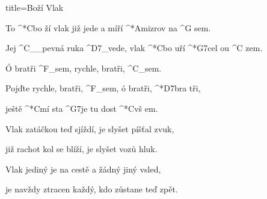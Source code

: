 \begin{song}{title=\predtitle\centering Boží Vlak\\\large \vspace*{-0.3cm}}  %
\begin{centerjustified}
\nejnejvetsi
	
\sloka 
	To ^*{C}bo ží vlak již jede a míří ^*{Ami}zrov na ^{G\,\,}sem.
	
	Jej ^{C{\color{white}\_\_}}pevná ruka ^{D7{\color{white}\_}}vede, vlak ^*{C}bo uří ^*{G7}cel ou ^{C\,\,}zem.
	
	Ó bratři ^{F{\color{white}\_}}sem, rychle, bratři, ^{C{\color{white}\_}}sem.
	
	Pojďte rychle, bratři, ^{F{\color{white}\_}}sem, ó bratři, ^*{D7}bra tři, 
	
	ještě ^*{C}mí sta ^{G7}je tu dost ^*{C}vš em.
	
\sloka
	Vlak zatáčkou teď sjíždí, je slyšet píšťal zvuk,
	
	již rachot kol se blíží, je slyšet vozů hluk.
	

\sloka
	Vlak jediný je na cestě a žádný jiný vsled,
	
	je navždy ztracen každý, kdo zůstane teď zpět.
	
\end{centerjustified}
	\setcounter{Slokočet}{0}
\end{song}
